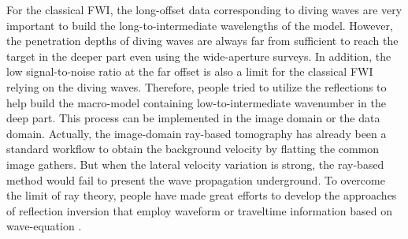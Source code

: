 \documentclass[extra,mreferee]{gji}
\begin{document}
For the classical FWI, the long-offset data
corresponding to diving waves are very important to build the long-to-intermediate
wavelengths of the model. However, the penetration depths of
diving waves are always far from sufficient to reach the target in the deeper part
even using the wide-aperture surveys.
In addition, the low signal-to-noise ratio at the far
offset is also a limit for the classical FWI relying on the diving waves.
Therefore, people tried to utilize the reflections
to help build the macro-model containing low-to-intermediate wavenumber
in the deep part\cite[]{Stork1992,ChaventEtAl1994,clement:2001,Symes2008a,xu:2012}.
This process can be implemented in the image domain or the data domain.
Actually, the image-domain ray-based tomography
\cite[]{Stork1992,Woodward1992,Woodward2008,Jones2010} has already been a standard workflow to obtain the background velocity by flatting the common
image gathers. But when the lateral velocity variation is strong, the ray-based method would fail to
present the wave propagation underground.
To overcome the limit of ray theory,
people have made great efforts to develop the approaches of reflection inversion that employ
waveform or traveltime information based on wave-equation
\cite[]{xu:2012,Ma2013,Wu2015b,Zhou2015,Wang2015,Chi2015}.
\end{document}
